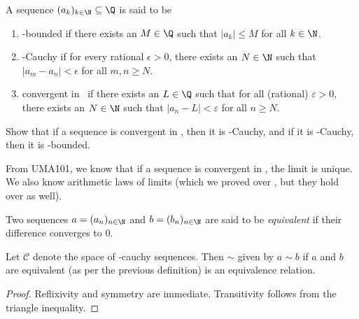 \begin{definition*}
    A sequence $(a_k)_{k \in \N} \subseteq \Q$ is said to be
    \begin{enumerate}
        \item \Q-bounded if there exists an $M \in \Q$ such that
        $|a_k| \le M$ for all $k \in \N$.
        \item \Q-Cauchy if for every rational $\epsilon > 0$, there exists
        an $N \in \N$ such that $|a_m - a_n| < \epsilon$ for all
        $m, n \ge N$.
        \item convergent in \Q\ if there exists an $L \in \Q$ such that
        for all (rational) $\varepsilon > 0$, there exists an $N \in \N$
        such that $|a_n - L| < \varepsilon$ for all $n \ge N$.
    \end{enumerate}
\end{definition*}

\begin{exercise}
    Show that if a sequence is convergent in \Q, then it is \Q-Cauchy,
    and if it is \Q-Cauchy, then it is \Q-bounded.
\end{exercise}
\begin{remark}
    From UMA101, we know that if a sequence is convergent in \Q, the limit
    is unique.
    We also know arithmetic laws of limits (which we proved over \R, but
    they hold over \Q as well).
\end{remark}

\begin{definition}
    Two sequences $a = (a_n)_{n \in \N}$ and $b = (b_n)_{n \in \N}$ are said
    to be \emph{equivalent} if their difference converges to $0$.
\end{definition}

\begin{proposition}
    Let $\mathcal{C}$ denote the space of \Q-cauchy sequences.
    Then $\sim$ given by $a \sim b$ if $a$ and $b$ are equivalent (as per
    the previous definition) is an equivalence relation.
\end{proposition}
\begin{proof}
    Reflixivity and symmetry are immediate.
    Transitivity follows from the triangle inequality.
\end{proof}

